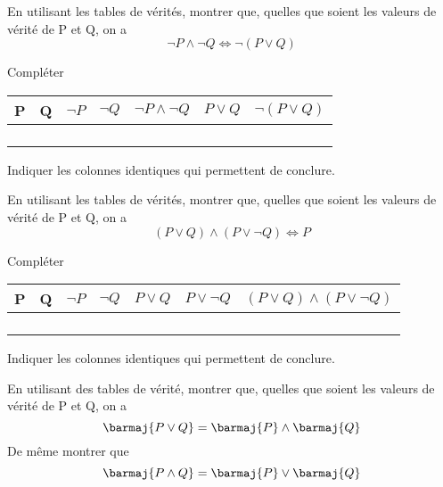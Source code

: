 \documentclass[a4paper,12pt]{article}
\begin{document}

\exo{}

En utilisant les tables de vérités, montrer que, quelles que soient les valeurs de vérité de P et Q, on a $$\neg P \wedge \neg Q \Leftrightarrow \neg(P\vee Q)$$

Compléter

\begin{center}

	\begin{tabular}{|c|c|c|c|c|c|c|}
		\hline
		P & Q & $\neg P$ & $\neg Q$ & $\neg P \wedge \neg Q$  & $P\vee Q$ & $\neg(P\vee Q)$ \\
		\hline
		&  &  &  &  &  &\\
		\hline
&		&  &  &  &  &  \\
		\hline
&		&  &  &  &  &  \\
		\hline
&		&  &  &  &  &  \\
		\hline
	\end{tabular}
\end{center}
Indiquer les colonnes identiques qui permettent de conclure.\\[2em]

\exo{}

En utilisant les tables de vérités, montrer que, quelles que soient les valeurs de vérité de P et Q, on a $$(P\vee Q)\wedge (P\vee \neg Q)\Leftrightarrow P$$

Compléter

\begin{center}

	\begin{tabular}{|c|c|c|c|c|c|c|}
		\hline
		P & Q & $\neg P$ & $\neg Q$ & $P \vee Q$  & $P\vee \neg Q$ & $(P\vee Q)\wedge (P\vee \neg Q)$\\
		\hline
		&  &  &  &  &  &\\
		\hline
		&  &  &  &  &  &\\
		\hline
		&  &  &  &  &  &\\
		\hline
		&  &  &  & 	&  &  \\
		\hline
	\end{tabular}
\end{center}
Indiquer les colonnes identiques qui permettent de conclure.\\[2em]



En utilisant des tables de vérité, montrer que, quelles que soient les valeurs de vérité de P et Q, on a $$\barmaj{P\vee Q}=\barmaj{P}\wedge\barmaj{Q}$$
De même  montrer que $$\barmaj{P\wedge Q}=\barmaj{P}\vee\barmaj{Q}$$
\newpage
{}
\end{document}
